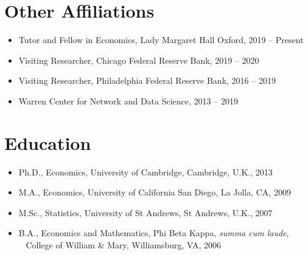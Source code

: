 \documentclass[line,overlapped]{myres}
\begin{document}
\begin{resume}
\section{\sc Other Affiliations}
\begin{itemize}
\item Tutor and Fellow in Economics, Lady Margaret Hall Oxford, 2019 -- Present
\item Visiting Researcher, Chicago Federal Reserve Bank, 2019 -- 2020
\item Visiting Researcher, Philadelphia Federal Reserve Bank, 2016 -- 2019
\item Warren Center for Network and Data Science, 2013 -- 2019 
\end{itemize}

\section{\sc Education}
\begin{itemize}
\item Ph.D., Economics, University of Cambridge, Cambridge, U.K., 2013
\item M.A., Economics, University of California San Diego, La Jolla, CA, 2009
\item M.Sc., Statistics, University of St Andrews, St Andrews, U.K., 2007
\item B.A., Economics and Mathematics, Phi Beta Kappa, \emph{summa cum laude},\\ 
  \-\ \hspace{1em} College of William \& Mary, Williamsburg, VA, 2006
\end{itemize}





\end{resume}
\end{document}

